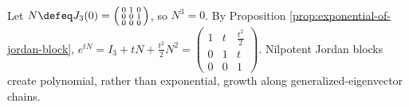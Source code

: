 \begin{example} \label{ex:nilpotent-jordan-block-linear-evolution} \\
Let $N\defeq J_3(0)=\left(\begin{smallmatrix}0&1&0\\0&0&1\\0&0&0\end{smallmatrix}\right)$, so $N^3=0$. By Proposition \ref{prop:exponential-of-jordan-block}, $e^{tN}=I_3+tN+\frac{t^2}{2}N^2=\left(\begin{smallmatrix}1&t&\frac{t^2}{2}\\0&1&t\\0&0&1\end{smallmatrix}\right)$. Nilpotent Jordan blocks create polynomial, rather than exponential, growth along generalized-eigenvector chains.
\end{example}
